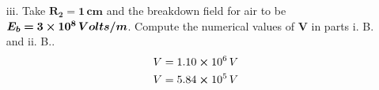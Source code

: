 \documentclass[]{article}
\begin{document}
{\begin{enumerate}
\begin{enumerate}
					\item[B.] What choice of inner radius would maximize $\bm{U}$? What is the maximum value Of $\bm{U}$ and the corresponding value Of $\bm{V}$?
						\begin{equation*}
							\begin{split}
								\frac{dU}{dR_1} &= \frac{E_b^2 L }{4k_e} \frac{d}{dR_1} \left[ R_1^4 \ln(\frac{R_2}{R_1}) \right] = 0 \\
								R_1 &= \frac{R_2}{e^\frac{1}{4}} \\
								V &= (E_b \frac{R_2}{e^\frac{1}{4}}) \ln \left( \frac{R_2}{\frac{R_2}{e^\frac{1}{4}}} \right) = \frac{E_bR_2}{4e^{\frac{1}{4}}} 
							\end{split}
						\end{equation*}
					
				\end{enumerate}
				\item[iii.] Take $\bm{R_2 = 1 \, cm}$ and the breakdown field for air to be $\bm{E_b = 3} \cross \bm{10^8 \, Volts/m}$. Compute the numerical values of $\bm{V}$ in parts i. B. and ii. B..
					\begin{equation*}
						\begin{split}
							V &= 1.10 \cross 10^6 \, V \\
							V &= 5.84 \cross 10^5 \, V \\
						\end{split}
					\end{equation*}
			\end{enumerate}
		
		\clearpage
		
}
\end{document}
